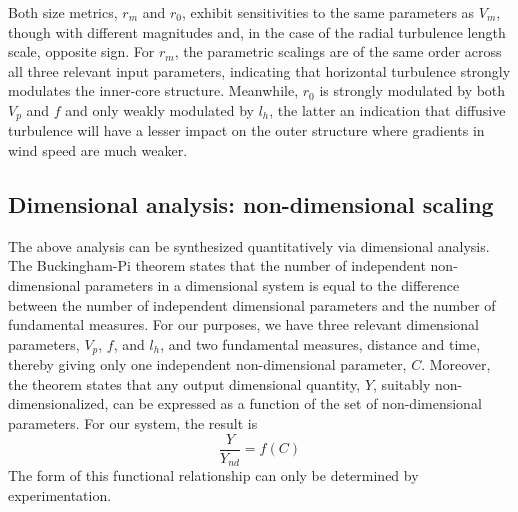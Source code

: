\documentclass[12pt]{article}
\begin{document}
Both size metrics, $r_m$ and $r_0$, exhibit sensitivities to the same parameters as $V_m$, though with different magnitudes and, in the case of the radial turbulence length scale, opposite sign. For $r_m$, the parametric scalings are of the same order across all three relevant input parameters, indicating that horizontal turbulence strongly modulates the inner-core structure. Meanwhile, $r_0$ is strongly modulated by both $V_p$ and $f$ and only weakly modulated by $l_h$, the latter an indication that diffusive turbulence will have a lesser impact on the outer structure where gradients in wind speed are much weaker.

\subsection{Dimensional analysis: non-dimensional scaling}
The above analysis can be synthesized quantitatively via dimensional analysis. The Buckingham-Pi theorem states that the number of independent non-dimensional parameters in a dimensional system is equal to the difference between the number of independent dimensional parameters and the number of fundamental measures. For our purposes, we have three relevant dimensional parameters, $V_p$, $f$, and $l_h$, and two fundamental measures, distance and time, thereby giving only one independent non-dimensional parameter, $C$. Moreover, the theorem states that any output dimensional quantity, $Y$, suitably non-dimensionalized, can be expressed as a function of the set of non-dimensional parameters.  For our system, the result is
\begin{equation}
	\label{eq:buckpi}
	\frac{Y}{Y_{nd}} = f(C)
\end{equation}
The form of this functional relationship can only be determined by experimentation.
\end{document}

